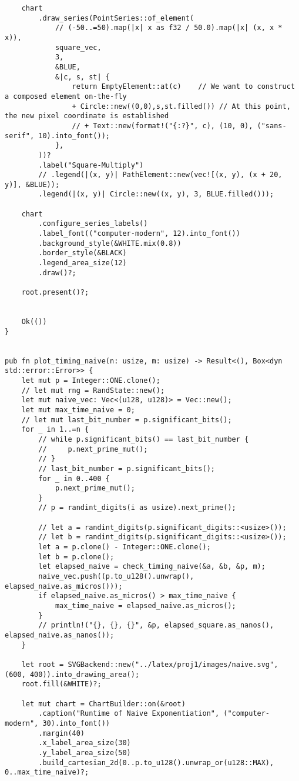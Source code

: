 \begin{verbatim}
    chart
        .draw_series(PointSeries::of_element(
            // (-50..=50).map(|x| x as f32 / 50.0).map(|x| (x, x * x)),
            square_vec,
            3,
            &BLUE,
            &|c, s, st| {
                return EmptyElement::at(c)    // We want to construct a composed element on-the-fly
                + Circle::new((0,0),s,st.filled()) // At this point, the new pixel coordinate is established
                // + Text::new(format!("{:?}", c), (10, 0), ("sans-serif", 10).into_font());
            },
        ))?
        .label("Square-Multiply")
        // .legend(|(x, y)| PathElement::new(vec![(x, y), (x + 20, y)], &BLUE));
        .legend(|(x, y)| Circle::new((x, y), 3, BLUE.filled()));

    chart
        .configure_series_labels()
        .label_font(("computer-modern", 12).into_font())
        .background_style(&WHITE.mix(0.8))
        .border_style(&BLACK)
        .legend_area_size(12)
        .draw()?;

    root.present()?;


    Ok(())
}


pub fn plot_timing_naive(n: usize, m: usize) -> Result<(), Box<dyn std::error::Error>> {
    let mut p = Integer::ONE.clone();
    // let mut rng = RandState::new();
    let mut naive_vec: Vec<(u128, u128)> = Vec::new();
    let mut max_time_naive = 0;
    // let mut last_bit_number = p.significant_bits();
    for _ in 1..=n {
        // while p.significant_bits() == last_bit_number {
        //     p.next_prime_mut();
        // }
        // last_bit_number = p.significant_bits();
        for _ in 0..400 {
            p.next_prime_mut();
        }
        // p = randint_digits(i as usize).next_prime();

        // let a = randint_digits(p.significant_digits::<usize>());
        // let b = randint_digits(p.significant_digits::<usize>());
        let a = p.clone() - Integer::ONE.clone();
        let b = p.clone();
        let elapsed_naive = check_timing_naive(&a, &b, &p, m);
        naive_vec.push((p.to_u128().unwrap(), elapsed_naive.as_micros()));
        if elapsed_naive.as_micros() > max_time_naive {
            max_time_naive = elapsed_naive.as_micros();
        }
        // println!("{}, {}, {}", &p, elapsed_square.as_nanos(), elapsed_naive.as_nanos());
    }

    let root = SVGBackend::new("../latex/proj1/images/naive.svg", (600, 400)).into_drawing_area();
    root.fill(&WHITE)?;

    let mut chart = ChartBuilder::on(&root)
        .caption("Runtime of Naive Exponentiation", ("computer-modern", 30).into_font())
        .margin(40)
        .x_label_area_size(30)
        .y_label_area_size(50)
        .build_cartesian_2d(0..p.to_u128().unwrap_or(u128::MAX), 0..max_time_naive)?;


\end{verbatim}
